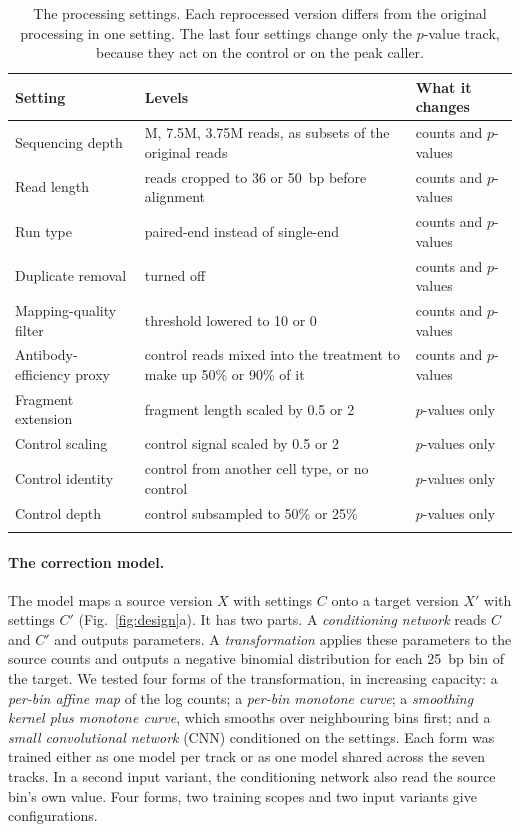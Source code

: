 \documentclass[pdflatex,sn-mathphys-num]{sn-jnl}
\newcommand{\lit}[1]{#1}
\begin{document}
\begin{table}[t]
\caption{The processing settings. Each reprocessed version differs from the original
processing in one setting. The last four settings change only the $p$-value track, because
they act on the control or on the peak caller.}
\label{tab:settings}
\footnotesize
\begin{tabular}{@{}>{\raggedright\arraybackslash}p{}>{\raggedright\arraybackslash}p{}>{\raggedright\arraybackslash}p{}@{}}
\toprule
Setting & Levels & What it changes \\
\midrule
Sequencing depth & \lit{15}M, \lit{7.5}M, \lit{3.75}M reads, as subsets of the original reads & counts and $p$-values \\
Read length & reads cropped to \lit{36} or \lit{50}~bp before alignment & counts and $p$-values \\
Run type & paired-end instead of single-end & counts and $p$-values \\
Duplicate removal & turned off & counts and $p$-values \\
Mapping-quality filter & threshold lowered to \lit{10} or \lit{0} & counts and $p$-values \\
Antibody-efficiency proxy & control reads mixed into the treatment to make up \lit{50}\% or \lit{90}\% of it & counts and $p$-values \\
Fragment extension & fragment length scaled by \lit{0.5} or \lit{2} & $p$-values only \\
Control scaling & control signal scaled by \lit{0.5} or \lit{2} & $p$-values only \\
Control identity & control from another cell type, or no control & $p$-values only \\
Control depth & control subsampled to \lit{50}\% or \lit{25}\% & $p$-values only \\
\botrule
\end{tabular}
\end{table}

\paragraph{The correction model.} The model maps a source version $X$ with settings $C$ onto a
target version $X'$ with settings $C'$ (Fig.~\ref{fig:design}a). It has two parts. A
\emph{conditioning network} reads $C$ and $C'$ and outputs parameters. A \emph{transformation}
applies these parameters to the source counts and outputs a negative binomial distribution
for each \lit{25}~bp bin of the target. We tested four forms of the transformation, in
increasing capacity: a \emph{per-bin affine map} of the log counts; a \emph{per-bin monotone
curve}; a \emph{smoothing kernel plus monotone curve}, which smooths over neighbouring bins
first; and a \emph{small convolutional network} (CNN) conditioned on the settings. Each form
was trained either as one model per track or as one model shared across the seven tracks. In
a second input variant, the conditioning network also read the source bin's own value. Four
forms, two training scopes and two input variants give \nGenCfg{} configurations.
\end{document}
